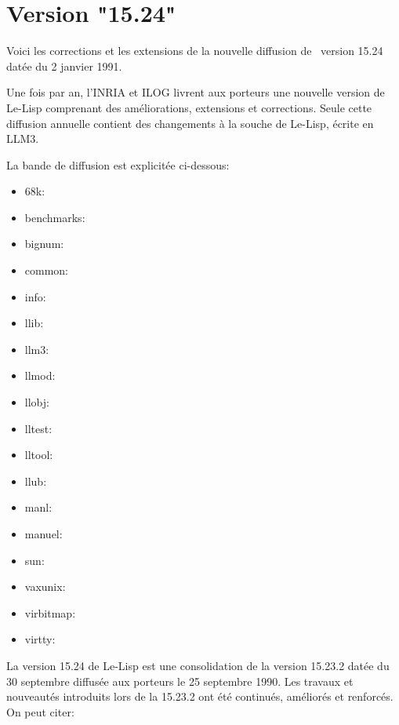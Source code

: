 

\Begin
{}


                 
                            
\chapter {Version "15.24"}
Voici les corrections et les extensions de la nouvelle diffusion de
\LeLisp\ version 15.24 dat\'{e}e du 2 janvier 1991.

Une fois par an, l'INRIA et ILOG livrent aux porteurs une nouvelle
version de Le-Lisp comprenant des am\'{e}liorations, extensions et
corrections.  Seule cette diffusion annuelle contient des changements
\`{a} la souche de Le-Lisp, \'{e}crite en LLM3.


La bande de diffusion est explicit\'{e}e ci-dessous:

\begin {itemize}
\item   68k:            
\item   benchmarks:
\item   bignum:
\item   common: 
\item   info:
\item   llib:           
\item   llm3:
\item   llmod:
\item   llobj:
\item   lltest:         
\item   lltool:
\item   llub:   
\item   manl:
\item   manuel: 
\item   sun:
\item   vaxunix:
\item   virbitmap:
\item   virtty: 
\end {itemize}



La version 15.24 de Le-Lisp est une consolidation de la version
15.23.2 dat\'{e}e du 30 septembre diffus\'{e}e aux porteurs le 25 septembre
1990. Les travaux et nouveaut\'{e}s introduits lors de la 15.23.2 ont
\'{e}t\'{e} continu\'{e}s, am\'{e}lior\'{e}s et renforc\'{e}s. \\
On peut citer:

